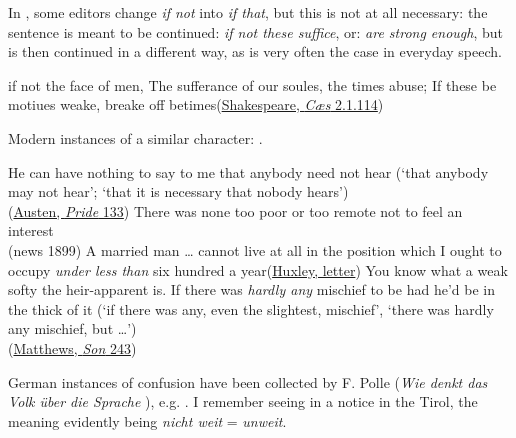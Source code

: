 In , some editors change \textit{if not} into \textit{if that}, but this is not at all necessary: the sentence is meant to be continued: \textit{if not these suffice}, or: \textit{are strong enough}, but is then continued in a different way, as is very often the case in everyday speech.

\ea \label{ex:07-101}
if not the face of men, The sufferance of our soules, the times abuse; If these be motiues weake, breake off betimes\hfill(\href{https://internetshakespeare.uvic.ca/doc/JC_F1/scene/2.1/index.html#tln-745}{Shakespeare, \textit{Cæs} 2.1.114}) 
\z

Modern instances of a similar character: .

\ea \label{ex:07-102}
\ea
He can have nothing to say to me that anybody need not hear  \phantom{x} (`that anybody may not hear'; `that it is necessary that nobody hears')\\\hfill(\href{https://archive.org/details/prideprejudice00aust/page/132/mode/2up?q=%22anybody+need+not+hear%22&view=theater}{Austen, \textit{Pride} 133})
\ex
There was none too poor or too remote not to feel an interest\\\hfill(news 1899)
\ex
A married man {\dots} cannot live at all in the position which I ought to occupy \emph{under less than} six hundred a year\hfill(\href{https://archive.org/details/lifelettersoftho0001huxl_m9n2/page/118/mode/2up?q=%22married+man%22&view=theater}{Huxley, letter}) %
\ex
You know what a weak softy the heir-apparent is. %
If there was \emph{hardly any} mischief to be had he'd be in the thick of it \phantom{x}(`if there was any, even the slightest, mischief', `there was hardly any mischief, but {\dots}')\\\hfill(\href{https://books.google.co.jp/books?id=5Pw_AAAAYAAJ&printsec=frontcover&hl=ja#v=onepage&q&f=false}{Matthews, \textit{Son} 243}) %
\z
\z

German instances of confusion have been collected by F. Polle (\textit{Wie denkt das Volk über die Sprache} \citeyear[\href{https://archive.org/details/wiedenktdasvolk01pollgoog/page/n27/mode/2up?view=theater}{14}]{polle1889}), %
e.g. . I remember seeing  in a notice in the Tirol, the meaning evidently being \textit{nicht weit} = \textit{unweit}.

